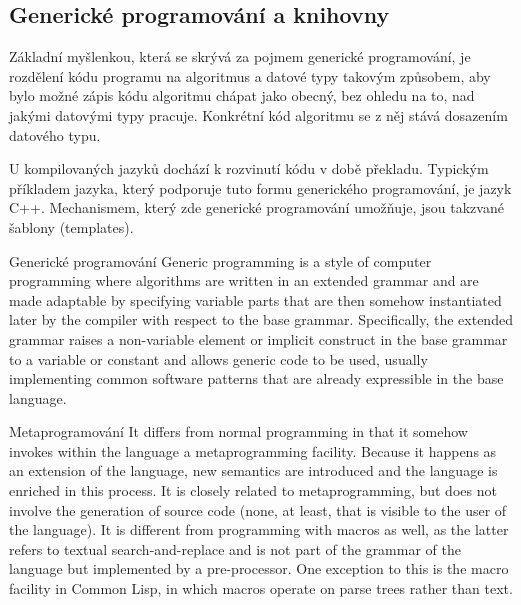 \subsection{Generické programování a knihovny}

Základní myšlenkou, která se skrývá za pojmem generické programování, je rozdělení kódu programu na algoritmus a datové typy takovým způsobem, aby bylo možné zápis kódu algoritmu chápat jako obecný, bez ohledu na to, nad jakými datovými typy pracuje. Konkrétní kód algoritmu se z něj stává dosazením datového typu.

U kompilovaných jazyků dochází k rozvinutí kódu v době překladu. Typickým příkladem jazyka, který podporuje tuto formu generického programování, je jazyk C++. Mechanismem, který zde generické programování umožňuje, 
jsou takzvané šablony (templates).

\medskip
\begin{definiceN}{Generické programování}
Generic programming is a style of computer programming where algorithms are written in an extended grammar and are made adaptable by specifying variable parts that are then somehow instantiated later by the compiler with respect to the base grammar. Specifically, the extended grammar raises a non-variable element or implicit construct in the base grammar to a variable or constant and allows generic code to be used, usually implementing common software patterns that are already expressible in the base language.
\end{definiceN}

\begin{poznamkaN}{Metaprogramování}
It differs from normal programming in that it somehow invokes within the language a metaprogramming facility. Because it happens as an extension of the language, new semantics are introduced and the language is enriched in this process. It is closely related to metaprogramming, but does not involve the generation of source code (none, at least, that is visible to the user of the language). It is different from programming with macros as well, as the latter refers to textual search-and-replace and is not part of the grammar of the language but implemented by a pre-processor. One exception to this is the macro facility in Common Lisp, in which macros operate on parse trees rather than text.
\end{poznamkaN}

